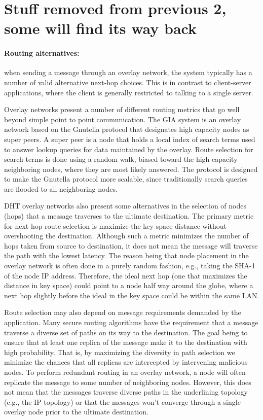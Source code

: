 



\section{Stuff removed from previous 2, some will find its way back}

\paragraph{Routing alternatives:} when sending a message through an
overlay network, the system typically has a number of valid
alternative next-hop choices.  This is in contrast to client-server
applications, where the client is generally restricted to talking to a
single server. 

Overlay networks present a number of different routing metrics that go
well beyond simple point to point communication. The GIA system is an
overlay network based on the Gnutella protocol that designates high
capacity nodes as super peers. A super peer is a node that holds a local
index of search terms used to answer lookup queries for data maintained
by the overlay. Route selection for search terms is done using a random 
walk, biased toward the high capacity neighboring nodes, where
they are most likely answered. The protocol is designed to make the Gnutella
protocol more scalable, since traditionally search queries are flooded to 
all neighboring nodes.

DHT overlay networks also present some alternatives in the selection of nodes
(hops) that a message traverses to the ultimate destination. The
primary metric for next hop route selection is maximize the key space distance
without overshooting the destination. Although such a metric minimizes the 
number of hops taken from source to destination, it does not mean the message
will traverse the path with the lowest latency. The reason being that node placement
in the overlay network is often done in a purely random fashion, e.g., taking the
SHA-1 of the node IP address. Therefore, the ideal next hop (one that maximizes
the distance in key space) could point to a node half way around the globe, where a
next hop slightly before the ideal in the key space could be within the same LAN.

Route selection may also depend on message requirements demanded by
the application. Many secure routing algorithms have the requirement
that a message traverse a diverse set of paths on its way to the
destination. The goal being to ensure that at least one replica of the
message make it to the destination with high probability. That is, by
maximizing the diversity in path selection we minimize the chances
that all replicas are intercepted by intervening malicious nodes. To
perform redundant routing in an overlay network, a node will often
replicate the message to some number of neighboring nodes. However,
this does not mean that the messages traverse diverse paths in the
underlining topology (e.g., the IP topology) or that the messages
won't converge through a single overlay node prior to the ultimate
destination.


